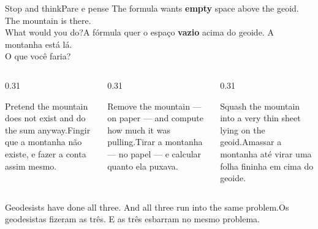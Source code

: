 \documentclass[aspectratio=169,11pt]{beamer}
\newcommand{\tr}[2]{\ifEN#2\else#1\fi}
\newcommand{\bnum}[1]{\textbf{\textcolor{mTeal}{#1}}}
\begin{document}
\begin{frame}{\tr{Pare e pense}{Stop and think}}
  \centering
  \tr{A fórmula quer o espaço \bnum{vazio} acima do geoide. A montanha \alert{está lá}.
  \\ O que você faria?}{The formula wants \bnum{empty} space above the geoid. The mountain
  \alert{is there}.\\ What would you do?}
  \bigskip

  \begin{columns}[T]
    \begin{column}{0.31\textwidth}
      \begin{regra}[title={\tr{(a) Fingir}{(a) Pretend}}]
        \small\raggedright\tr{Fingir que a montanha não existe, e fazer a conta assim
        mesmo.}{Pretend the mountain does not exist and do the sum anyway.}
      \end{regra}
    \end{column}
    \begin{column}{0.31\textwidth}
      \begin{regra}[title={\tr{(b) Tirar}{(b) Remove}}]
        \small\raggedright\tr{Tirar a montanha --- no papel --- e calcular quanto ela
        puxava.}{Remove the mountain --- on paper --- and compute how much it was pulling.}
      \end{regra}
    \end{column}
    \begin{column}{0.31\textwidth}
      \begin{regra}[title={\tr{(c) Amassar}{(c) Squash}}]
        \small\raggedright\tr{Amassar a montanha até virar uma folha fininha em cima do
        geoide.}{Squash the mountain into a very thin sheet lying on the geoid.}
      \end{regra}
    \end{column}
  \end{columns}
  \bigskip

  \tr{Os geodesistas fizeram as três. E as três esbarram no mesmo problema.}{Geodesists have
  done all three. And all three run into the same problem.}
\end{frame}
\end{document}
